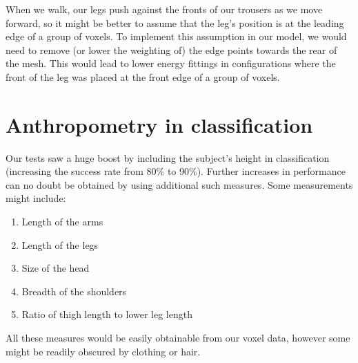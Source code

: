 When we walk, our legs push against the fronts of our trousers as we move forward, so it might be better to assume that the leg's position is at the leading edge of a group of voxels.
To implement this assumption in our model, we would need to remove (or lower the weighting of) the edge points towards the rear of the mesh.
This would lead to lower energy fittings in configurations where the front of the leg was placed at the front edge of a group of voxels.


\section{Anthropometry in classification}

Our tests saw a huge boost by including the subject's height in classification (increasing the success rate from 80\% to 90\%).
Further increases in performance can no doubt be obtained by using additional such measures.
Some measurements might include:

\begin{enumerate}
	\item Length of the arms
	\item Length of the legs
	\item Size of the head
	\item Breadth of the shoulders
	\item Ratio of thigh length to lower leg length
\end{enumerate}

All these measures would be easily obtainable from our voxel data, however some might be readily obscured by clothing or hair.


